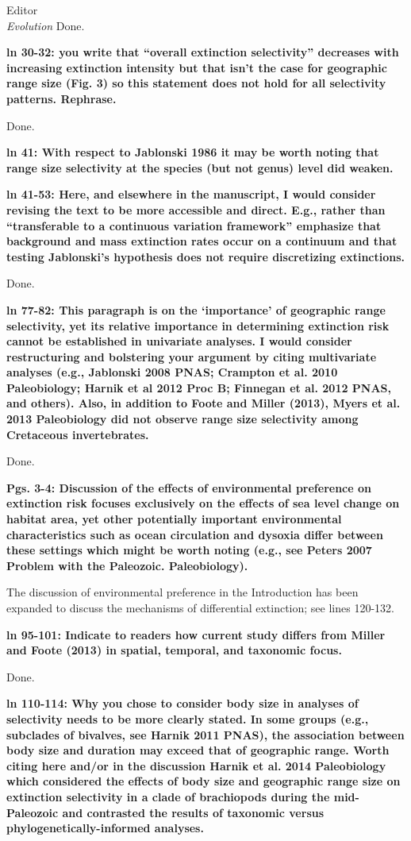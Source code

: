 \documentclass{letter}
\begin{document}
\begin{letter}{Editor \\ \textit{Evolution}}
  Done.

  \textbf{ln 30-32: you write that “overall extinction selectivity” decreases with increasing extinction intensity but that isn’t the case for geographic range size (Fig. 3) so this statement does not hold for all selectivity patterns. Rephrase.}

  Done.

  \textbf{ln 41: With respect to Jablonski 1986 it may be worth noting that range size selectivity at the species (but not genus) level did weaken.}


  \textbf{ln 41-53: Here, and elsewhere in the manuscript, I would consider revising the text to be more accessible and direct. E.g., rather than “transferable to a continuous variation framework” emphasize that background and mass extinction rates occur on a continuum and that testing Jablonski’s hypothesis does not require discretizing extinctions.}

  Done.

  \textbf{ln 77-82: This paragraph is on the ‘importance’ of geographic range selectivity, yet its relative importance in determining extinction risk cannot be established in univariate analyses. I would consider restructuring and bolstering your argument by citing multivariate analyses (e.g., Jablonski 2008 PNAS; Crampton et al. 2010 Paleobiology; Harnik et al 2012 Proc B; Finnegan et al. 2012 PNAS, and others). Also, in addition to Foote and Miller (2013), Myers et al. 2013 Paleobiology did not observe range size selectivity among Cretaceous invertebrates.}

  Done.

  \textbf{Pgs. 3-4: Discussion of the effects of environmental preference on extinction risk focuses exclusively on the effects of sea level change on habitat area, yet other potentially important environmental characteristics such as ocean circulation and dysoxia differ between these settings which might be worth noting (e.g., see Peters 2007 Problem with the Paleozoic. Paleobiology).}

  The discussion of environmental preference in the Introduction has been expanded to discuss the mechanisms of differential extinction; see lines 120-132. %


  \textbf{ln 95-101: Indicate to readers how current study differs from Miller and Foote (2013) in spatial, temporal, and taxonomic focus.}

  Done.

  \textbf{ln 110-114: Why you chose to consider body size in analyses of selectivity needs to be more clearly stated. In some groups (e.g., subclades of bivalves, see Harnik 2011 PNAS), the association between body size and duration may exceed that of geographic range. Worth citing here and/or in the discussion Harnik et al. 2014 Paleobiology which considered the effects of body size and geographic range size on extinction selectivity in a clade of brachiopods during the mid-Paleozoic and contrasted the results of taxonomic versus phylogenetically-informed analyses.}


\end{letter}
\end{document}
